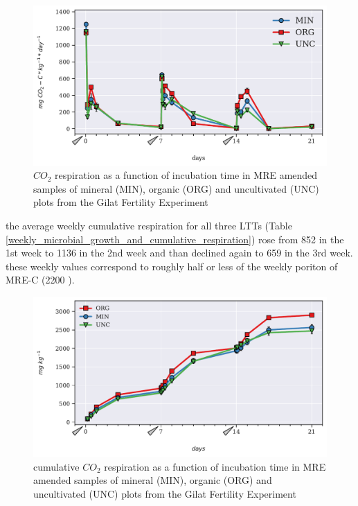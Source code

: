 		\begin{figure}[H]
			\centering
			\includegraphics[scale=0.8, width=\linewidth]{thesis_figures/main_incubation/MRE_treated/Resp.pdf}
			\caption{$CO_2$ respiration as a function of incubation time in MRE amended samples of mineral (MIN), organic (ORG) and uncultivated (UNC) plots from the Gilat Fertility Experiment}
			\label{fig:resp_treated_main}
		\end{figure}
		\noindent
		the average weekly cumulative respiration for all three LTTs (Table \ref{weekly_microbial_growth_and_cumulative_respiration}) rose from 852 \cumrespunit in the 1st week to 1136 \cumrespunit in the 2nd week and than declined again to 659 \cumrespunit in the 3rd week. these weekly values correspond to roughly half or less of the weekly poriton of MRE-C (2200 \genericunit).


		\begin{figure}[H]
			\centering
			\includegraphics[scale=0.8, width=\linewidth]{thesis_figures/test/Cum_Resp.pdf}
			\caption{cumulative $CO_2$ respiration  as a function of incubation time in MRE amended samples of mineral (MIN), organic (ORG) and uncultivated (UNC) plots from the Gilat Fertility Experiment}
			\label{fig:cum_resp_treated_main}
		\end{figure}

